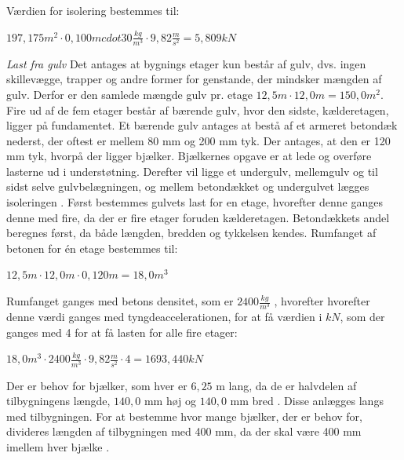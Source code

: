 Værdien for isolering bestemmes til:
\begin{center}
	$197,\!175 m^2\cdot 0,\!100 mcdot 30 \frac{kg}{m^3}\cdot 9,\!82 \frac{m}{s^2}=5,\!809 kN$
\end{center}

\textit{Last fra gulv}
\newline
Det antages at bygnings etager kun består af gulv, dvs. ingen skillevægge, trapper og andre former for genstande, der mindsker mængden af gulv. Derfor er den samlede mængde gulv pr. etage $12,\!5 m\cdot 12,\!0 m=150,\!0 m^2$.
\newline \indent{     }  Fire ud af de fem etager består af bærende gulv, hvor den sidste, kælderetagen, ligger på fundamentet. Et bærende gulv antages at bestå af et armeret betondæk nederst, der oftest er mellem 80 mm og 200 mm tyk. Der antages, at den er 120 mm tyk, hvorpå der ligger bjælker. Bjælkernes opgave er at lede og overføre lasterne ud i understøtning. Derefter vil ligge et undergulv, mellemgulv og til sidst selve gulvbelægningen, og mellem betondækket og undergulvet lægges isoleringen \citep{Gulvopbygning}. 
\newline \indent{     }  Først bestemmes gulvets last for en etage, hvorefter denne ganges denne med fire, da der er fire etager foruden kælderetagen. Betondækkets andel beregnes først, da både længden, bredden og tykkelsen kendes. 
\newline
\newline
Rumfanget af betonen for én etage bestemmes til:
\begin{center}
	$12,\!5 m\cdot 12,\!0 m\cdot 0,\!120 m=18,\!0 m^3$
\end{center}

Rumfanget ganges med betons densitet, som er $2400 \frac{kg}{m^3}$ \citep{betonsdensitet}, hvorefter hvorefter denne værdi ganges med tyngdeaccelerationen, for at få værdien i $kN$, som der ganges med 4 for at få lasten for alle fire etager:
\begin{center}
	$18,\!0 m^3\cdot 2400 \frac{kg}{m^3}\cdot 9,82 \frac{m}{s^2}\cdot 4=1693,440 kN$
\end{center}

Der er behov for bjælker, som hver er $6,\!25$ m lang, da de er halvdelen af tilbygningens længde, $140,\!0$ mm høj og $140,\!0$ mm bred \citep{granse}. Disse anlægges langs med tilbygningen. For at bestemme hvor mange bjælker, der er behov for, divideres længden af tilbygningen med 400 mm, da der skal være 400 mm imellem hver bjælke \citep{Gulvopbygning}. 

